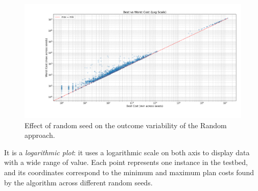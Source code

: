 \begin{figure}[h!]
	\centering
	\includegraphics[width=\textwidth]{images/randomization_random.png}
	\caption{Effect of random seed on the outcome variability of the Random approach.}
	\label{fig:rand_rand}
\end{figure}

It is a \textit{logarithmic plot}: it uses a logarithmic scale on both axis to display data with a wide range of value.
Each point represents one instance in the testbed, and its coordinates correspond to the minimum and maximum plan costs found
by the algorithm across different random seeds.
